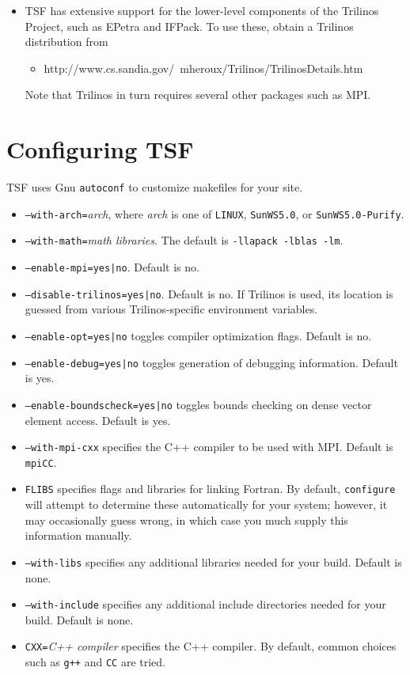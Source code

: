 \documentclass[10pt]{article}
\begin{document}
\begin{itemize}
\item TSF has extensive support for the lower-level components of the Trilinos Project, 
such as EPetra and IFPack. To use these, obtain a Trilinos distribution from 
\begin{itemize}
\item http://www.cs.sandia.gov/~mheroux/Trilinos/TrilinosDetails.htm
\end{itemize}
Note that Trilinos in turn requires several other packages such as MPI. 
\end{itemize}

\section{Configuring TSF}

TSF uses Gnu {\tt autoconf} to customize makefiles for your site. 

\begin{itemize}
\item {\tt --with-arch=}{\it arch}, where {\it arch} is one of {\tt LINUX}, 
{\tt SunWS5.0}, or {\tt SunWS5.0-Purify}.
\item {\tt --with-math=}{\it math libraries}. The default is {\tt -llapack -lblas -lm}.
\item {\tt --enable-mpi=yes|no}. Default is no. 
\item {\tt --disable-trilinos=yes|no}. Default is no. If Trilinos is used, its location
is guessed from various Trilinos-specific environment variables.
\item {\tt --enable-opt=yes|no} toggles compiler optimization flags. Default is
no. 
\item {\tt --enable-debug=yes|no} toggles generation of debugging information. 
Default is yes. 
\item {\tt --enable-boundscheck=yes|no} toggles bounds checking on dense vector 
element access. Default is yes. 
\item {\tt --with-mpi-cxx} specifies the C++ compiler to be used with MPI. Default is
{\tt mpiCC}. 
\item {\tt FLIBS} specifies flags and libraries for linking Fortran. By default,
{\tt configure} will attempt to determine these automatically for your system; however,
it may occasionally guess wrong, in which case you much supply this information
manually. 
\item {\tt --with-libs} specifies any additional libraries needed for your build. Default
is none.
\item {\tt --with-include} specifies any additional include directories
needed for your build. Default is none.
\item {\tt CXX=}{\it C++ compiler} specifies the C++ compiler. By default, common choices
such as {\tt g++} and {\tt CC} are tried. 
\end{itemize}
\end{document}
